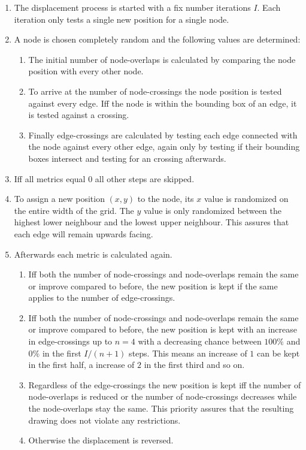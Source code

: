 \documentclass[]{llncs}
\begin{document}
\medskip
\begin{enumerate}[start=0]
    \item The displacement process is started with a fix number iterations $I$. Each iteration only tests a single new position for a single node.
    \item A node is chosen completely random and the following values are determined:
    \begin{enumerate}
        \item The initial number of node-overlaps is calculated by comparing the node position with every other node.
        \item To arrive at the number of node-crossings the node position is tested against every edge. Iff the node is within the bounding box of an edge, it is tested against a crossing.
        \item Finally edge-crossings are calculated by testing each edge connected with the node against every other edge, again only by testing if their bounding boxes intersect and testing for an crossing afterwards.
    \end{enumerate}
	\item Iff all metrics equal $0$ all other steps are skipped.
    \item To assign a new position $(x,y)$ to the node, its $x$ value is randomized on the entire width of the grid. The $y$ value is only randomized between the highest lower neighbour and the lowest upper neighbour. This assures that each edge will remain upwards facing.
    \item Afterwards each metric is calculated again.
    \begin{enumerate}
        \item Iff both the number of node-crossings and node-overlaps remain the same or improve compared to before, the new position is kept if the same applies to the number of edge-crossings.
        \item Iff both the number of node-crossings and node-overlaps remain the same or improve compared to before, the new position is kept with an increase in edge-crossings up to $n = 4$ with a decreasing chance between $100\%$ and $0\%$ in the first $I / (n + 1)$ steps. This means an increase of $1$ can be kept in the first half, a increase of $2$ in the first third and so on. 
        \item Regardless of the edge-crossings the new position is kept iff the number of node-overlaps is reduced or the number of node-crossings decreases while the node-overlaps stay the same. This priority assures that the resulting drawing does not violate any restrictions.
        \item Otherwise the displacement is reversed.
    \end{enumerate}
\end{enumerate}
\end{document}
